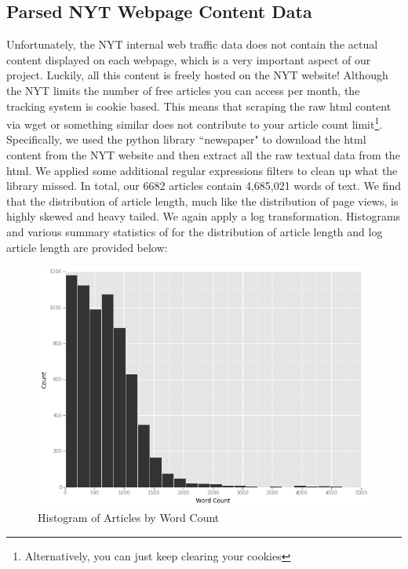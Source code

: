 \documentclass[fleqn,12pt]{SelfArx} %
\begin{document}
\subsection{Parsed NYT Webpage Content Data}
Unfortunately, the NYT internal web traffic data does not contain the actual content displayed on each webpage, which is a very important aspect of our project. Luckily, all this content is freely hosted on the NYT website! Although the NYT limits the number of free articles you can access per month, the tracking system is cookie based. This means that scraping the raw html content via wget or something similar does not contribute to your article count limit\footnote{Alternatively, you can just keep clearing your cookies}. Specifically, we used the python library ``newspaper" to download the html content from the NYT website and then extract all the raw textual data from the html. We applied some additional regular expressions filters to clean up what the library missed. In total, our 6682 articles contain 4,685,021 words of text.  We find that the distribution of article length, much like the distribution of page views, is highly skewed and heavy tailed. We again apply a log transformation. Histograms and various summary statistics of for the distribution of article length and log article length are provided below:

\begin{figure}[ht]\centering
\includegraphics[width=\linewidth]{wordcount_hist}
\caption{Histogram of Articles by Word Count}
\label{fig:pv_hist}
\end{figure}
\end{document}
